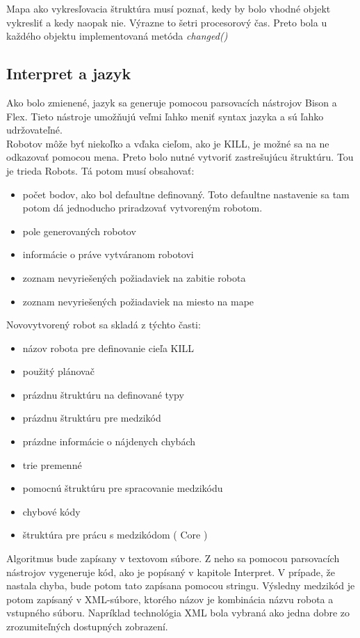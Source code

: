 Mapa ako vykresľovacia štruktúra musí poznať, kedy by bolo vhodné objekt vykresliť a kedy naopak nie. Výrazne to šetri procesorový čas. Preto bola u každého objektu implementovaná metóda {\it changed() } 

\subsection{Interpret a jazyk}
Ako bolo zmienené, jazyk sa generuje pomocou parsovacích nástrojov Bison a Flex. Tieto nástroje umožňujú veľmi ľahko meniť syntax jazyka a sú ľahko udržovateľné.\\ %
Robotov môže byť niekoľko a vďaka cieľom, ako je KILL, je možné sa na ne odkazovať pomocou mena. Preto bolo nutné vytvoriť zastrešujúcu štruktúru. Tou je trieda Robots. Tá potom musí obsahovať:
\begin{itemize}
\item počet bodov, ako bol defaultne definovaný. Toto defaultne nastavenie sa tam potom dá jednoducho priradzovať vytvoreným robotom.
\item pole generovaných robotov
\item informácie o práve vytváranom robotovi
\item zoznam nevyriešených požiadaviek na zabitie robota
\item zoznam nevyriešených požiadaviek na miesto na mape
\end{itemize}
Novovytvorený robot sa skladá z týchto časti:
\begin{itemize}
\item názov robota pre definovanie cieľa KILL
\item použitý plánovač
\item prázdnu štruktúru na definované typy
\item prázdnu štruktúru pre medzikód
\item prázdne informácie o nájdenych chybách
\item trie premenné
\item pomocnú štruktúru pre spracovanie medzikódu %
\item chybové kódy
\item štruktúra pre prácu s medzikódom ( Core )
\end{itemize}
Algoritmus bude zapísany v textovom súbore. Z neho sa pomocou parsovacích nástrojov vygeneruje kód, ako je popísaný v kapitole Interpret. V prípade, že nastala chyba, bude potom tato zapísana pomocou stringu. Výsledny medzikód je potom zapísaný v XML-súbore, ktorého názov je kombinácia názvu robota a vstupného súboru. Napríklad technológia XML bola vybraná ako jedna dobre zo zrozumiteľných dostupných zobrazení. 

